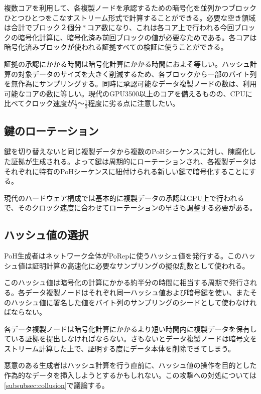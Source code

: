 \documentclass[12pt]{ltjsarticle}
\begin{document}
複数コアを利用して、各複製ノードを承認するための暗号化を並列かつブロックひとつひとつをこなすストリーム形式で計算することができる。必要な空き領域は合計で\(ブロック２個分 * コア数\)になり、これは各コア上で行われる今回ブロックの暗号化計算に、暗号化済み前回ブロックの値が必要なためである。各コアは暗号化済みブロックが使われる証拠すべての検証に使うことができる。

証拠の承認にかかる時間は暗号化計算にかかる時間におよそ等しい。ハッシュ計算の対象データのサイズを大きく削減するため、各ブロックから一部のバイト列を無作為にサンプリングする。同時に承認可能なデータ複製ノードの数は、利用可能なコアの数に等しい。現代のGPU3500以上のコアを備えるものの、CPUに比べてクロック速度が\(\frac{1}{2}\)〜\(\frac{1}{3}\)程度に劣る点に注意したい。

\subsection{鍵のローテーション}

鍵を切り替えないと同じ複製データから複数のPoHシーケンスに対し、陳腐化した証拠が生成される。よって鍵は周期的にローテーションされ、各複製データはそれぞれに特有のPoHシーケンスに紐付けられる新しい鍵で暗号化することにする。

現代のハードウェア構成では基本的に複製データの承認はGPU上で行われるで、そのクロック速度に合わせてローテーションの早さも調整する必要がある。

\subsection{ハッシュ値の選択}\label{hashselection}

PoH生成者はネットワーク全体がPoRepに使うハッシュ値を発行する。このハッシュ値は証明計算の高速化に必要なサンプリングの擬似乱数として使われる。

このハッシュ値は暗号化の計算にかかる約半分の時間に相当する周期で発行される。各データ複製ノードはそれぞれ同一ハッシュ値および暗号鍵を使い、またそのハッシュ値に署名した値をバイト列のサンプリングのシードとして使わなければならない。

各データ複製ノードは暗号化計算にかかるより短い時間内に複製データを保有している証拠を提出しなければならない。さもないとデータ複製ノードは暗号文をストリーム計算した上で、証明する度にデータ本体を削除できてしまう。

悪意のある生成者はハッシュ計算を行う直前に、ハッシュ値の操作を目的とした作為的なデータを挿入しようとするかもしれない。この攻撃への対処については\ref{subsubsec:collusion}で議論する。
\end{document}
